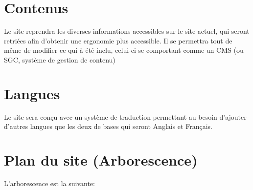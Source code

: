 \documentclass[oneside]{report}
\begin{document}
{		\section{Contenus}
		{
			\par Le site reprendra les diverses informations accessibles sur le site actuel, qui seront retriées afin d’obtenir une ergonomie plus accessible. Il se permettra tout de même de modifier ce qui à été inclu, celui-ci se comportant comme un CMS (ou SGC, système de gestion de contenu)
		}
		\section{Langues}
		{
			\par Le site sera conçu avec un système de traduction permettant au besoin d'ajouter d'autres langues que les deux de bases qui seront Anglais et Français.
		}

		\section{Plan du site (Arborescence)}
		{
			\par L'arborescence est la suivante:\\
			\noindent{}
		}

}
\end{document}
